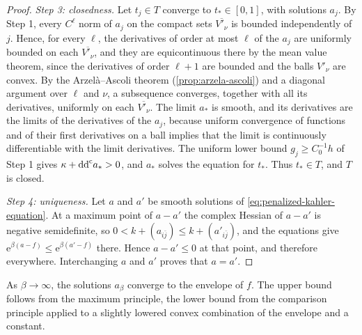 \begin{proof}
\emph{Step 3: closedness.} Let $t_j\in T$ converge to $t_*\in[0,1]$, with solutions $a_j$. By Step 1, every $C^\ell$ norm of $a_j$ on the compact sets $\overline{V'_\nu}$ is bounded independently of $j$. Hence, for every $\ell$, the derivatives of order at most $\ell$ of the $a_j$ are uniformly bounded on each $\overline{V'_\nu}$, and they are equicontinuous there by the mean value theorem, since the derivatives of order $\ell+1$ are bounded and the balls $V'_\nu$ are convex. By the Arzel\`a--Ascoli theorem (\cref{prop:arzela-ascoli}) and a diagonal argument over $\ell$ and $\nu$, a subsequence converges, together with all its derivatives, uniformly on each $\overline{V'_\nu}$. The limit $a_*$ is smooth, and its derivatives are the limits of the derivatives of the $a_j$, because uniform convergence of functions and of their first derivatives on a ball implies that the limit is continuously differentiable with the limit derivatives. The uniform lower bound $g_j\geq C_0^{-1}h$ of Step 1 gives $\kappa+\mathrm{dd}^{\mathrm{c}} a_*>0$, and $a_*$ solves the equation for $t_*$. Thus $t_*\in T$, and $T$ is closed.

\emph{Step 4: uniqueness.} Let $a$ and $a'$ be smooth solutions of \eqref{eq:penalized-kahler-equation}. At a maximum point of $a-a'$ the complex Hessian of $a-a'$ is negative semidefinite, so $0<k+(a_{i\bar j})\leq k+(a'_{i\bar j})$, and the equations give $\mathrm e^{\beta(a-f)}\leq\mathrm e^{\beta(a'-f)}$ there. Hence $a-a'\leq0$ at that point, and therefore everywhere. Interchanging $a$ and $a'$ proves that $a=a'$.
\end{proof}

As $\beta\to\infty$, the solutions $a_\beta$ converge to the envelope of $f$. The upper bound follows from the maximum principle, the lower bound from the comparison principle applied to a slightly lowered convex combination of the envelope and a constant.

